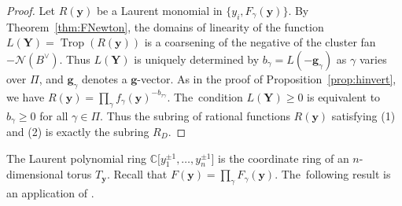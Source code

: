 \documentclass[pdftex]{sigma}%
\def\C{{\mathbb C}}
\def\y{{\mathbf y}}
\def\N{{\mathcal{N}}}
\def\Trop{\operatorname{Trop}}
\def\g{{\mathbf g}}
\def\Y{{\mathbf Y}}
\numberwithin{equation}{section}
\begin{document}
\begin{proof}
Let $R(\y)$ be a Laurent monomial in $\{y_i, F_\gamma(\y)\}$. By Theorem~\ref{thm:FNewton}, the domains of linearity of the function $L(\Y) = \Trop(R(\y))$ is a coarsening of the negative of the cluster fan $-\N(B^\vee)$. Thus $L(\Y)$ is uniquely determined by $b_\gamma = L(-\g_\gamma)$ as $\gamma$ varies over $\Pi$, and $\g_\gamma$ denotes a $\g$-vector. As in the proof of Proposition~\ref{prop:hinvert}, we have $R(\y) = \prod_\gamma f_\gamma(\y)^{-b_{\tau\gamma}}$. The~condition $L(\Y) \geq 0$ is equivalent to $b_\gamma \geq 0$ for all $\gamma \in \Pi$. Thus the subring of rational functions $R(\y)$ satisfying (1) and (2) is exactly the subring $R_D$.
\end{proof}

\medskip{}
The Laurent polynomial ring $\C\big[y_1^{\pm 1}, \dots, y_n^{\pm 1}\big]$ is the coordinate ring of an $n$-dimensional torus $T_\y$. Recall that $F(\y) = \prod_\gamma F_\gamma(\y)$. The~following result is an application of \cite[Section~10]{AHL}.
\end{document}
